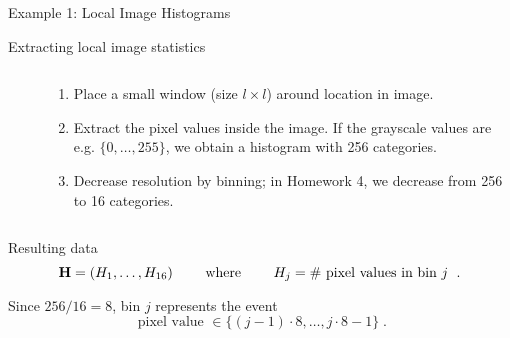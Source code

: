 \documentclass[dvipsnames,mathserif]{beamer}
\begin{document}
{%

\begin{frame}{Example 1: Local Image Histograms}
  \begin{block}{Extracting local image statistics}
    \begin{columns}
      \begin{column}{0\textwidth}
      \end{column}
      \begin{column}{0.5\textwidth}
      \end{column}
      \begin{column}{0.5\textwidth}
        \begin{enumerate}
        \item Place a small window (size $l\times l$) around location in image.
        \item Extract the pixel values inside the image. If the grayscale values are e.g. $\lbrace 0,\ldots,255\rbrace$,
          we obtain a histogram with 256 categories.
        \item Decrease resolution by binning; in Homework 4, we decrease from 256 to 16 categories.
        \end{enumerate}
      \end{column}
    \end{columns}
  \end{block}
\vspace{-2mm}
  \begin{block}{Resulting data}
\vspace{-6mm}
    \begin{equation*}
      \mathbf{H}=(H_1,\ldots,H_{16})
      \qquad\text{ where }\qquad
      H_j=\#\text{ pixel values in bin $j$ }\;.
    \end{equation*}
  \end{block}
\vspace{-2mm}
  Since $256/16=8$, bin $j$ represents the event
  \begin{equation*}
    \text{ pixel value }\in\lbrace (j-1)\cdot 8,\ldots, j\cdot 8 -1\rbrace \;.
  \end{equation*}
\end{frame}

}
\end{document}
